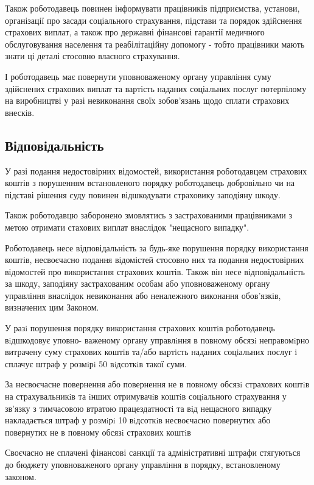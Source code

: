 Також роботодавець повинен інформувати працівників підприємства, установи, організації про засади соціального страхування, підстави та порядок здійснення страхових виплат, а також про державні фінансові гарантії медичного обслуговування населення та реабілітаційну допомогу - тобто працівники мають знати ці деталі стосовно власного страхування.


І роботодавець має повернути уповноваженому органу управління суму здійснених страхових виплат та вартість наданих соціальних послуг потерпілому на виробництві у разі невиконання своїх зобов'язань щодо сплати страхових внесків.


\subsection*{Відповідальність}


У разі подання недостовірних відомостей, використання роботодавцем страхових коштів з порушенням встановленого порядку роботодавець добровільно чи на підставі рішення суду повинен відшкодувати страховику заподіяну шкоду.


Також роботодавцю заборонено змовлятись з застрахованими працівниками з метою отримати стахових виплат внаслідок "нещасного випадку".

Роботодавець несе відповідальність за будь-яке порушення порядку використання коштів, несвоєчасно подання відомістей стосовно них та подання недостовірних відомостей про використання страхових коштів. Також він несе відповідальність за шкоду, заподіяну застрахованим особам або уповноваженому органу управління внаслідок невиконання або неналежного виконання обов'язків, визначених цим Законом.

У разi порушення порядку використання страхових коштiв роботодавець вiдшкодовує уповно-
важеному органу управлiння в повному обсязi неправомiрно витрачену суму страхових коштiв та/або
вартiсть наданих соцiальних послуг i сплачує штраф у розмiрi 50 вiдсоткiв такої суми.

За несвоєчасне повернення або повернення не в повному обсязi страхових коштiв на страхувальникiв та iнших отримувачiв коштiв соцiального страхування у зв’язку з тимчасовою втратою працездатностi та вiд нещасного випадку накладається штраф у розмiрi 10 вiдсоткiв несвоєчасно повернутих або повернутих не в повному обсязi страхових коштiв

Своєчасно не сплачені фінансові санкції та адміністративні штрафи стягуються до бюджету уповноваженого органу управління в порядку, встановленому законом.


